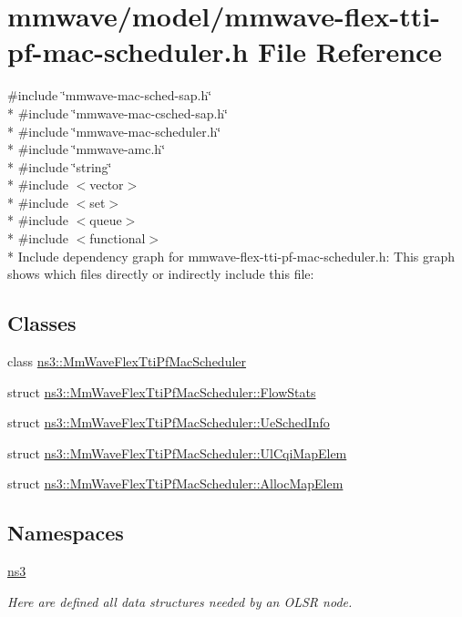 \hypertarget{mmwave-flex-tti-pf-mac-scheduler_8h}{}\section{mmwave/model/mmwave-\/flex-\/tti-\/pf-\/mac-\/scheduler.h File Reference}
\label{mmwave-flex-tti-pf-mac-scheduler_8h}
{\ttfamily \#include \char`\"{}mmwave-\/mac-\/sched-\/sap.\+h\char`\"{}}\\*
{\ttfamily \#include \char`\"{}mmwave-\/mac-\/csched-\/sap.\+h\char`\"{}}\\*
{\ttfamily \#include \char`\"{}mmwave-\/mac-\/scheduler.\+h\char`\"{}}\\*
{\ttfamily \#include \char`\"{}mmwave-\/amc.\+h\char`\"{}}\\*
{\ttfamily \#include \char`\"{}string\char`\"{}}\\*
{\ttfamily \#include $<$vector$>$}\\*
{\ttfamily \#include $<$set$>$}\\*
{\ttfamily \#include $<$queue$>$}\\*
{\ttfamily \#include $<$functional$>$}\\*
Include dependency graph for mmwave-\/flex-\/tti-\/pf-\/mac-\/scheduler.h\+:
This graph shows which files directly or indirectly include this file\+:
\subsection*{Classes}
\begin{DoxyCompactItemize}
\item 
class \hyperlink{classns3_1_1MmWaveFlexTtiPfMacScheduler}{ns3\+::\+Mm\+Wave\+Flex\+Tti\+Pf\+Mac\+Scheduler}
\item 
struct \hyperlink{structns3_1_1MmWaveFlexTtiPfMacScheduler_1_1FlowStats}{ns3\+::\+Mm\+Wave\+Flex\+Tti\+Pf\+Mac\+Scheduler\+::\+Flow\+Stats}
\item 
struct \hyperlink{structns3_1_1MmWaveFlexTtiPfMacScheduler_1_1UeSchedInfo}{ns3\+::\+Mm\+Wave\+Flex\+Tti\+Pf\+Mac\+Scheduler\+::\+Ue\+Sched\+Info}
\item 
struct \hyperlink{structns3_1_1MmWaveFlexTtiPfMacScheduler_1_1UlCqiMapElem}{ns3\+::\+Mm\+Wave\+Flex\+Tti\+Pf\+Mac\+Scheduler\+::\+Ul\+Cqi\+Map\+Elem}
\item 
struct \hyperlink{structns3_1_1MmWaveFlexTtiPfMacScheduler_1_1AllocMapElem}{ns3\+::\+Mm\+Wave\+Flex\+Tti\+Pf\+Mac\+Scheduler\+::\+Alloc\+Map\+Elem}
\end{DoxyCompactItemize}
\subsection*{Namespaces}
\begin{DoxyCompactItemize}
\item 
 \hyperlink{namespacens3}{ns3}
\begin{DoxyCompactList}\small\item\em Here are defined all data structures needed by an O\+L\+SR node. \end{DoxyCompactList}\end{DoxyCompactItemize}
